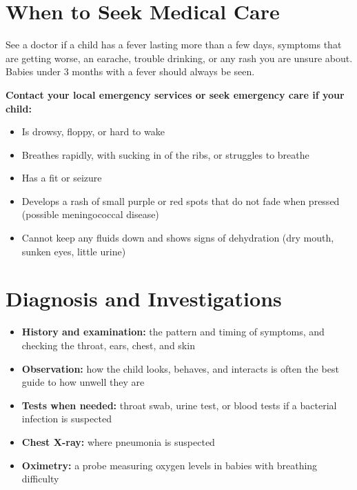 \section*{When to Seek Medical Care}
See a doctor if a child has a fever lasting more than a few days, symptoms that are getting worse, an earache, trouble drinking, or any rash you are unsure about. Babies under 3 months with a fever should always be seen.

\textbf{Contact your local emergency services or seek emergency care if your child:}
\begin{itemize}
    \item Is drowsy, floppy, or hard to wake
    \item Breathes rapidly, with sucking in of the ribs, or struggles to breathe
    \item Has a fit or seizure
    \item Develops a rash of small purple or red spots that do not fade when pressed (possible meningococcal disease)
    \item Cannot keep any fluids down and shows signs of dehydration (dry mouth, sunken eyes, little urine)
\end{itemize}

\section*{Diagnosis and Investigations}
\begin{itemize}
    \item \textbf{History and examination:} the pattern and timing of symptoms, and checking the throat, ears, chest, and skin
    \item \textbf{Observation:} how the child looks, behaves, and interacts is often the best guide to how unwell they are
    \item \textbf{Tests when needed:} throat swab, urine test, or blood tests if a bacterial infection is suspected
    \item \textbf{Chest X-ray:} where pneumonia is suspected
    \item \textbf{Oximetry:} a probe measuring oxygen levels in babies with breathing difficulty
\end{itemize}

